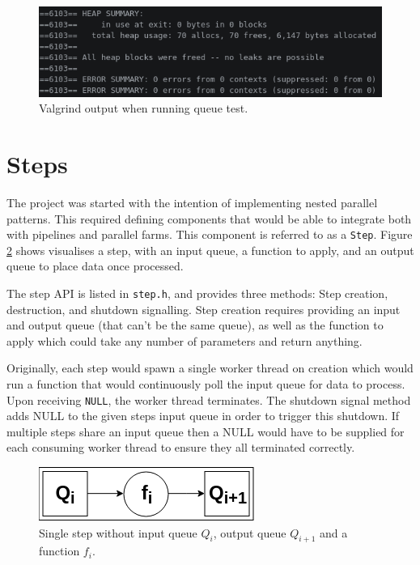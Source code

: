 \documentclass[12pt]{article}
\def\code#1{\texttt{#1}}
\begin{document}
\begin{figure}[!ht]
	\centering 
	\includegraphics[width=\linewidth]{images/queuegrind}
	\caption{Valgrind output when running queue test.}
	\label{fig:queuegrind}
\end{figure}

\section{Steps}

The project was started with the intention of implementing nested parallel patterns. This required defining components that would be able to integrate both with pipelines and parallel farms. This component is referred to as a \code{Step}. Figure \ref{fig:step} shows visualises a step, with an input queue, a function to apply, and an output queue to place data once processed.

The step API is listed in \code{step.h}, and provides three methods: Step creation, destruction, and shutdown signalling. Step creation requires providing an input and output queue (that can't be the same queue), as well as the function to apply which could take any number of parameters and return anything. 

Originally, each step would spawn a single worker thread on creation which would run a function that would continuously poll the input queue for data to process. Upon receiving \code{NULL}, the worker thread terminates. The shutdown signal method adds NULL to the given steps input queue in order to trigger this shutdown. If multiple steps share an input queue then a NULL would have to be supplied for each consuming worker thread to ensure they all terminated correctly.

\begin{figure}[!ht]
	\centering 
	\includegraphics[width=0.45\linewidth]{images/step}
	\caption{Single step without input queue $Q_i$, output queue $Q_{i+1}$ and a function $f_i$.}
	\label{fig:step}
\end{figure}
\end{document}

